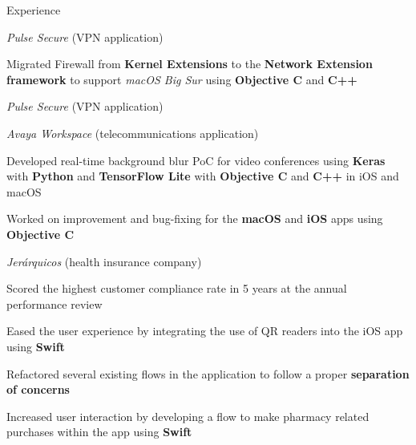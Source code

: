 \documentclass{curriculum}
\begin{document}
\begin{cvsection}{Experience}
\begin{sectionitemlist}
        \item{\textit{Pulse Secure} (VPN application)}
            \begin{sectionitemlist}
            \item{
                Migrated Firewall from \textbf{Kernel Extensions} to the
                \textbf{Network Extension framework} to support \textit{macOS Big Sur}
                using \textbf{Objective C} and \textbf{C++}
            }
            \end{sectionitemlist}

        \item{\textit{Pulse Secure} (VPN application)}
        \item{\textit{Avaya Workspace} (telecommunications application)}
            \begin{sectionitemlist}
            \item{
                Developed real-time background blur PoC for video conferences using
                \textbf{Keras} with \textbf{Python} and \textbf{TensorFlow Lite}
                with \textbf{Objective C} and \textbf{C++} in iOS and macOS
            }
            \item{
                Worked on improvement and bug-fixing for the \textbf{macOS}
                and \textbf{iOS} apps using \textbf{Objective C}
            }
            \end{sectionitemlist}

        \pagebreak %
        \item{\textit{Jerárquicos} (health insurance company)}
            \begin{sectionitemlist}
            \item{
                Scored the highest customer compliance rate
                in 5 years at the annual performance review
            }
            \item{
                Eased the user experience by integrating the use of
                QR readers into the iOS app using \textbf{Swift}
            }
            \item{
                Refactored several existing flows in the application
                to follow a proper \textbf{separation of concerns}
            }
            \item {
                Increased user interaction by developing a flow to make pharmacy
                related purchases within the app using \textbf{Swift}
            }
            \end{sectionitemlist}


\end{sectionitemlist}
\end{cvsection}
\end{document}

